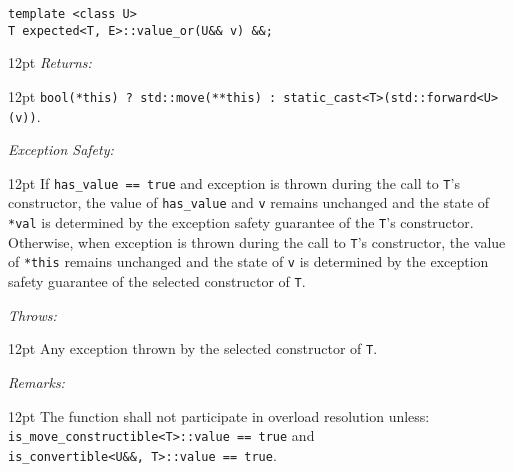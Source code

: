 \documentclass[a4paper,10pt]{article}
\newcommand{\cpp}[1]{\lstinline{#1}}
\newcommand{\wordingItem}[1]{\noindent\textit{#1:}}
\newenvironment{wordingTextItem}[1]{\wordingItem{#1}\vspace{7pt}\noindent\begin{adjustwidth}{12pt}{}}{\vspace{7pt}\end{adjustwidth}}
\newenvironment{wordingPara}{\begin{adjustwidth}{12pt}{}}{\end{adjustwidth}}
\begin{document}
\begin{lstlisting}[xleftmargin=0pt]
template <class U>
T expected<T, E>::value_or(U&& v) &&; 
\end{lstlisting}
\begin{wordingPara}
\begin{wordingTextItem}{Returns}
\cpp{bool(*this) ? std::move(**this) : static_cast<T>(std::forward<U>(v))}.
\end{wordingTextItem}
\begin{wordingTextItem}{Exception Safety}
If \cpp{has_value == true} and exception is thrown during the call to \cpp{T}'s constructor, the value of \cpp{has_value} and \cpp{v} remains unchanged and the state of \cpp{*val} is determined by the exception safety guarantee of the \cpp{T}'s constructor. Otherwise, when exception is thrown during the call to \cpp{T}'s constructor, the value of \cpp{*this} remains unchanged and the state of \cpp{v} is determined by the exception safety guarantee of the selected constructor of \cpp{T}.
\end{wordingTextItem}
\begin{wordingTextItem}{Throws}
Any exception thrown by the selected constructor of \cpp{T}.
\end{wordingTextItem}
\begin{wordingTextItem}{Remarks}
The function shall not participate in overload resolution unless: \\
\cpp{is_move_constructible<T>::value == true} and \\
\cpp{is_convertible<U&&, T>::value == true}.
\end{wordingTextItem}
\end{wordingPara}
\end{document}
